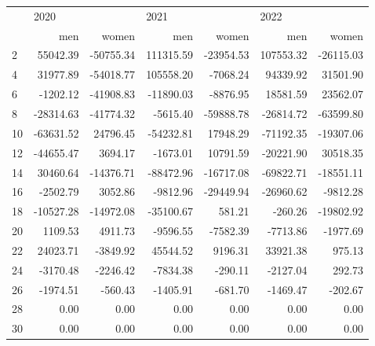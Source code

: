 \begin{tabular}{lrrrrrr}
\toprule
{} & \multicolumn{2}{l}{2020} & \multicolumn{2}{l}{2021} & \multicolumn{2}{l}{2022} \\
{} &       men &     women &        men &     women &        men &     women \\
\midrule
2  &  55042.39 & -50755.34 &  111315.59 & -23954.53 &  107553.32 & -26115.03 \\
4  &  31977.89 & -54018.77 &  105558.20 &  -7068.24 &   94339.92 &  31501.90 \\
6  &  -1202.12 & -41908.83 &  -11890.03 &  -8876.95 &   18581.59 &  23562.07 \\
8  & -28314.63 & -41774.32 &   -5615.40 & -59888.78 &  -26814.72 & -63599.80 \\
10 & -63631.52 &  24796.45 &  -54232.81 &  17948.29 &  -71192.35 & -19307.06 \\
12 & -44655.47 &   3694.17 &   -1673.01 &  10791.59 &  -20221.90 &  30518.35 \\
14 &  30460.64 & -14376.71 &  -88472.96 & -16717.08 &  -69822.71 & -18551.11 \\
16 &  -2502.79 &   3052.86 &   -9812.96 & -29449.94 &  -26960.62 &  -9812.28 \\
18 & -10527.28 & -14972.08 &  -35100.67 &    581.21 &    -260.26 & -19802.92 \\
20 &   1109.53 &   4911.73 &   -9596.55 &  -7582.39 &   -7713.86 &  -1977.69 \\
22 &  24023.71 &  -3849.92 &   45544.52 &   9196.31 &   33921.38 &    975.13 \\
24 &  -3170.48 &  -2246.42 &   -7834.38 &   -290.11 &   -2127.04 &    292.73 \\
26 &  -1974.51 &   -560.43 &   -1405.91 &   -681.70 &   -1469.47 &   -202.67 \\
28 &      0.00 &      0.00 &       0.00 &      0.00 &       0.00 &      0.00 \\
30 &      0.00 &      0.00 &       0.00 &      0.00 &       0.00 &      0.00 \\
\bottomrule
\end{tabular}
